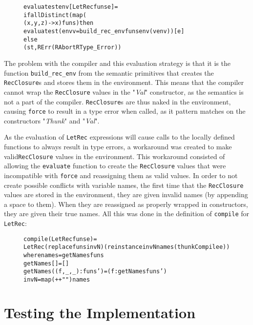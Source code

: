 \begin{figure}[H]
\begin{alltt}
  evaluate st env [LetRec funs e] =
    if allDistinct (map (\\(x,y,z) -> x) funs) then
      evaluate st (env {v = build_rec_env funs env (v env)}) [e]
    else
      (st, RErr (RAbort RType_Error))
\end{alltt}
\end{figure}

\noindent The problem with the compiler and this evaluation strategy is that it
is the function \texttt{build\_rec\_env} from the semantic primitives that
creates the \texttt{RecClosure}s and stores them in the environment. This means
that the compiler cannot wrap the \texttt{RecClosure} values in the
"\textit{Val}" constructor, as the semantics is not a part of the compiler.
\texttt{RecClosure}s are thus naked in the environment, causing \texttt{force}
to result in a type error when called, as it pattern matches on the constructors
"\textit{Thunk}" and "\textit{Val}".

As the evaluation of \texttt{LetRec} expressions will cause calls to the locally
defined functions to always result in type errors, a workaround was created to
make valid\texttt{RecClosure} values in the environment. This workaround
consisted of allowing the \texttt{evaluate} function to create the
\texttt{RecClosure} values that were incompatible with \texttt{force} and
reassigning them as valid values. In order to not create possible conflicts
with variable names, the first time that the \texttt{RecClosure} values are
stored in the environment, they are given invalid names (by appending a space
to them). When they are reassigned as properly wrapped in constructors, they
are given their true names. All this was done in the definition of
\texttt{compile} for \texttt{LetRec}:

\begin{figure}[H]
\begin{alltt}
compile (LetRec funs e) =
  LetRec (replace funs invN) (reinstance invN names (thunkCompile e))
  where names = getNames funs
        getNames [] = []
        getNames ((f,_,_):funs') = (f:getNames funs')
        invN = map (++ " ") names
\end{alltt}
\end{figure}

\section{Testing the Implementation}
